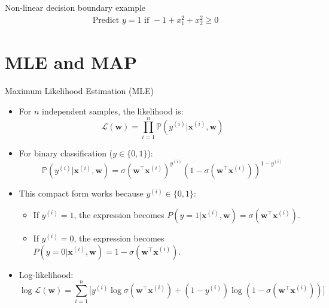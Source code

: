 \documentclass[serif, aspectratio=169]{beamer}
\begin{document}
\begin{frame}{Non-linear decision boundary example}
    \begin{align*}
        \text{Predict } y=1 \text{ if } -1 + x_1^2 + x_2^2 \geq 0
    \end{align*}
    
\end{frame}

\section{MLE and MAP}

\begin{frame}{Maximum Likelihood Estimation (MLE)}
    \begin{itemize}
        \item For $n$ independent samples, the likelihood is:
        \[
            \mathcal{L}(\mathbf{w}) = \prod_{i=1}^{n} \mathbb{P}(y^{(i)}|\mathbf{x}^{(i)}, \mathbf{w})
        \]
        \item For binary classification ($y \in \{0,1\}$):
        \[
            \mathbb{P}(y^{(i)}|\mathbf{x}^{(i)},\mathbf{w}) = \sigma (\mathbf{w}^\top \mathbf{x}^{(i)})^{y^{(i)}} (1 - \sigma (\mathbf{w}^\top \mathbf{x}^{(i)}))^{1 - y^{(i)}}
        \]
        \item This compact form works because $y^{(i)} \in \{0, 1\}$:
        \begin{itemize}
            \item If $y^{(i)}=1$, the expression becomes $P(y=1|\mathbf{x}^{(i)}, \mathbf{w}) = \sigma (\mathbf{w}^\top \mathbf{x}^{(i)})$.
            \item If $y^{(i)}=0$, the expression becomes $P(y=0|\mathbf{x}^{(i)}, \mathbf{w}) = 1 - \sigma (\mathbf{w}^\top \mathbf{x}^{(i)})$.
        \end{itemize}
        \item Log-likelihood:
        \[
            \log \mathcal{L}(\mathbf{w}) = \sum_{i=1}^n \big[ y^{(i)} \log \sigma(\mathbf{w}^\top \mathbf{x}^{(i)}) + (1-y^{(i)})\log (1-\sigma(\mathbf{w}^\top \mathbf{x}^{(i)})) \big]
        \]
    \end{itemize}
\end{frame}
\end{document}
